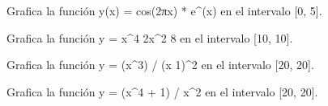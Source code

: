\documentclass[letterpaper,10pt,spanish]{sphinxmanual}
\begin{document}

\begin{fulllineitems}
\label{\detokenize{pr7:pr7.1.grafico_13}}
\pysigstartsignatures
{}
\pysigstopsignatures
\sphinxAtStartPar
Grafica la función y(x) = cos(2πx) * e\textasciicircum{}(\sphinxhyphen{}x) en el intervalo {[}0, 5{]}.

\end{fulllineitems}


\begin{fulllineitems}
\label{\detokenize{pr7:pr7.1.grafico_2}}
\pysigstartsignatures
{}
\pysigstopsignatures
\sphinxAtStartPar
Grafica la función y = x\textasciicircum{}4 \sphinxhyphen{} 2x\textasciicircum{}2 \sphinxhyphen{} 8 en el intervalo {[}\sphinxhyphen{}10, 10{]}.

\end{fulllineitems}


\begin{fulllineitems}
\label{\detokenize{pr7:pr7.1.grafico_3}}
\pysigstartsignatures
{}
\pysigstopsignatures
\sphinxAtStartPar
Grafica la función y = (x\textasciicircum{}3) / (x \sphinxhyphen{} 1)\textasciicircum{}2 en el intervalo {[}\sphinxhyphen{}20, 20{]}.

\end{fulllineitems}


\begin{fulllineitems}
\label{\detokenize{pr7:pr7.1.grafico_4}}
\pysigstartsignatures
{}
\pysigstopsignatures
\sphinxAtStartPar
Grafica la función y = (x\textasciicircum{}4 + 1) / x\textasciicircum{}2 en el intervalo {[}\sphinxhyphen{}20, 20{]}.

\end{fulllineitems}
\end{document}
